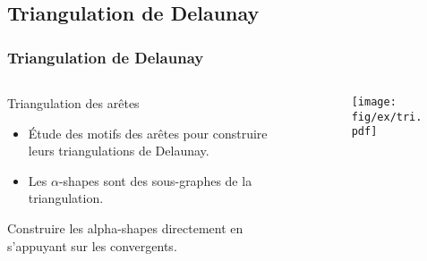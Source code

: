 \subsection{Triangulation de Delaunay}

\begin{frame}
  \frametitle{Triangulation de Delaunay}

	\begin{columns}[t]
 		\begin{column}{7cm}

			\begin{block}{Triangulation des arêtes}
				\begin{itemize}
					\item Étude des motifs des arêtes pour construire leurs triangulations de Delaunay.
					\item Les $\alpha$-shapes sont des sous-graphes de la triangulation. 
	      \end{itemize}	
			\end{block} 

			{
				\begin{block}{}
					\alert{Construire les alpha-shapes directement en s'appuyant sur les convergents.}
				\end{block}
			}
 		\end{column}
    \begin{column}{3cm}
			\begin{figure}[h!]
				\centering
			  \texttt{[image: fig/ex/tri.pdf]}
			\end{figure}
	  \end{column}
	\end{columns}
\end{frame}
